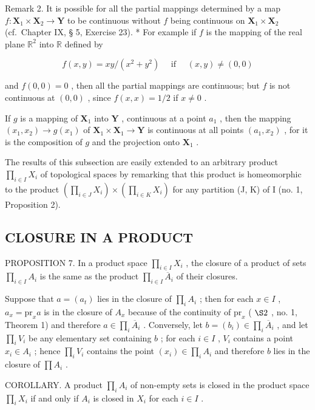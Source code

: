 Remark 2. It is possible for all the partial mappings determined by a map \(f: \mathbf{X}_{1} \times \mathbf{X}_{2} \to \mathbf{Y}\) to be continuous without \(f\) being continuous on \(\mathbf{X}_{1} \times \mathbf{X}_{2}\) (cf.~Chapter IX, § 5, Exercise 23). * For example if \(f\) is the mapping of the real plane \(\mathbb{R}^{2}\) into \(\mathbb{R}\) defined by

\[
f (x, y) = x y / \left(x ^ {2} + y ^ {2}\right) \quad \text { if } \quad (x, y) \neq (0, 0)
\]

and \(f(0, 0) = 0\) , then all the partial mappings are continuous; but \(f\) is not continuous at \((0, 0)\) , since \(f(x, x) = 1/2\) if \(x \neq 0\) .

If \(g\) is a mapping of \(\mathbf{X}_1\) into \(\mathbf{Y}\) , continuous at a point \(a_1\) , then the mapping \((x_1, x_2) \to g(x_1)\) of \(\mathbf{X}_1 \times \mathbf{X}_1 \to \mathbf{Y}\) is continuous at all points \((a_1, x_2)\) , for it is the composition of \(g\) and the projection onto \(\mathbf{X}_1\) .

The results of this subsection are easily extended to an arbitrary product \(\prod_{i\in I}X_i\) of topological spaces by remarking that this product is homeomorphic to the product \(\left(\prod_{i\in J}X_i\right)\times\left(\prod_{i\in K}X_i\right)\) for any partition (J, K) of I (no. 1, Proposition 2).

\subsection{CLOSURE IN A PRODUCT}

PROPOSITION 7. In a product space \(\prod_{i\in I}X_i\) , the closure of a product of sets \(\prod_{i\in I}A_i\) is the same as the product \(\prod_{i\in I}\overline{A}_i\) of their closures.

Suppose that \(a = (a_{t})\) lies in the closure of \(\prod_{i} A_{i}\) ; then for each \(x \in I\) , \(a_{x} = \text{pr}_{x} a\) is in the closure of \(A_{x}\) because of the continuity of \(\text{pr}_{x}\) ( \(\S 2\) , no. 1, Theorem 1) and therefore \(a \in \prod_{i} \overline{A}_{i}\) . Conversely, let \(b = (b_{i}) \in \prod_{i} \overline{A}_{i}\) , and let \(\prod_{i} V_{i}\) be any elementary set containing \(b\) ; for each \(i \in I\) , \(V_{i}\) contains a point \(x_{i} \in A_{i}\) ; hence \(\prod_{i} V_{i}\) contains the point \((x_{i}) \in \prod_{i} A_{i}\) and therefore \(b\) lies in the closure of \(\prod A_{i}\) .

COROLLARY. A product \(\prod_{i} A_{i}\) of non-empty sets is closed in the product space \(\prod_{i} X_{i}\) if and only if \(A_{i}\) is closed in \(X_{i}\) for each \(i \in I\) .

